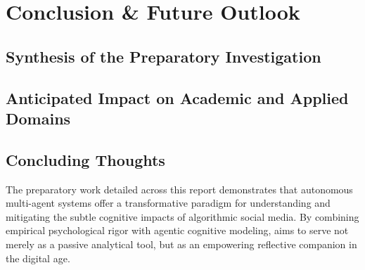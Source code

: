 \chapter{Conclusion \& Future Outlook}
\label{chap:conclusion}

\section{Synthesis of the Preparatory Investigation}
\label{sec:conclusion_synthesis}

\section{Anticipated Impact on Academic and Applied Domains}
\label{sec:conclusion_impact}

\section{Concluding Thoughts}
\label{sec:conclusion_remarks}
The preparatory work detailed across this report demonstrates that autonomous multi-agent systems offer a transformative paradigm for understanding and mitigating the subtle cognitive impacts of algorithmic social media. By combining empirical psychological rigor with agentic cognitive modeling, \projectname{} aims to serve not merely as a passive analytical tool, but as an empowering reflective companion in the digital age.

